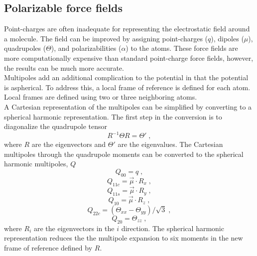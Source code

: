\documentclass[12pt]{report}
\begin{document}
\subsection{Polarizable force fields}

Point-charges are often inadequate for representing the electrostatic field
around a molecule.
The field can be improved by assigning point-charges ($q$), dipoles ($\mu$),
quadrupoles ($\Theta$), and polarizabilities ($\alpha$) to the atoms.
These force fields are more computationally expensive than standard
point-charge force fields, however, the results can be much more accurate. \\

Multipoles add an additional complication to the potential in that the
potential is aspherical.
To address this, a local frame of reference is defined for each atom.
Local frames are defined using two or three neighboring atoms. \\

A Cartesian representation of the multipoles can be simplified by converting
to a spherical harmonic representation.
The first step in the conversion is to diagonalize the quadrupole tensor
\begin{equation}
 R^{-1}\Theta R = \Theta' \; ,
\end{equation}
where $R$ are the eigenvectors and $\Theta'$ are the eigenvalues.
The Cartesian multipoles through the quadrupole moments can be converted to
the spherical harmonic multipoles, $Q$
\begin{equation}
 Q_{00} = q \; ,
\end{equation}
\begin{equation}
 Q_{11c} = \vec \mu \cdot R_x \; ,
\end{equation}
\begin{equation}
 Q_{11s} = \vec \mu \cdot R_y \; ,
\end{equation}
\begin{equation}
 Q_{10} = \vec \mu \cdot R_z \; ,
\end{equation}
\begin{equation}
 Q_{22c} = (\Theta_{xx}-\Theta_{yy})/\sqrt{3} \; ,
\end{equation}
\begin{equation}
 Q_{20} = \Theta_{zz} \; ,
\end{equation}
where $R_i$ are the eigenvectors in the $i$ direction.
The spherical harmonic representation reduces the the multipole expansion to
six moments in the new frame of reference defined by $R$. \cite{} \\
\end{document}
